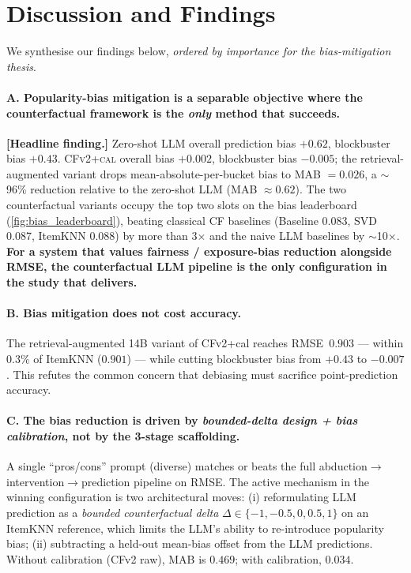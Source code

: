 \documentclass[11pt,a4paper]{article}
\begin{document}
\section{Discussion and Findings}
\label{sec:discussion}

We synthesise our findings below, \emph{ordered by importance for the
bias-mitigation thesis}.

\paragraph{A. Popularity-bias mitigation is a separable objective where
the counterfactual framework is the \emph{only} method that succeeds.}
\textbf{[Headline finding.]} Zero-shot LLM overall prediction bias
$+0.62$, blockbuster bias $+0.43$. \textsc{CFv2+cal} overall bias
$+0.002$, blockbuster bias $\mathbf{-0.005}$; the retrieval-augmented
variant drops mean-absolute-per-bucket bias to MAB $= 0.026$, a
$\sim$96\% reduction relative to the zero-shot LLM (MAB $\approx 0.62$).
The two counterfactual variants occupy the top two slots on the bias
leaderboard (\cref{fig:bias_leaderboard}), beating classical CF
baselines (Baseline 0.083, SVD 0.087, ItemKNN 0.088) by more than
3$\times$ and the naive LLM baselines by $\sim$10$\times$. \textbf{For a
system that values fairness / exposure-bias reduction alongside RMSE,
the counterfactual LLM pipeline is the only configuration in the study
that delivers.}

\paragraph{B. Bias mitigation does not cost accuracy.}
The retrieval-augmented 14B variant of CFv2+cal reaches RMSE~$0.903$ ---
within $0.3\%$ of ItemKNN ($0.901$) --- while cutting blockbuster bias
from $+0.43$ to $-0.007$. This refutes the common concern that debiasing
must sacrifice point-prediction accuracy.

\paragraph{C. The bias reduction is driven by \emph{bounded-delta design
+ bias calibration}, not by the 3-stage scaffolding.}
A single ``pros/cons'' prompt (diverse) matches or beats the full
abduction$\to$intervention$\to$prediction pipeline on RMSE. The active
mechanism in the winning configuration is two architectural moves: (i)
reformulating LLM prediction as a \emph{bounded counterfactual delta}
$\Delta \in \{-1,-0.5,0,0.5,1\}$ on an ItemKNN reference, which limits
the LLM's ability to re-introduce popularity bias; (ii) subtracting a
held-out mean-bias offset from the LLM predictions. Without calibration
(CFv2 raw), MAB is $0.469$; with calibration, $0.034$.
\end{document}
